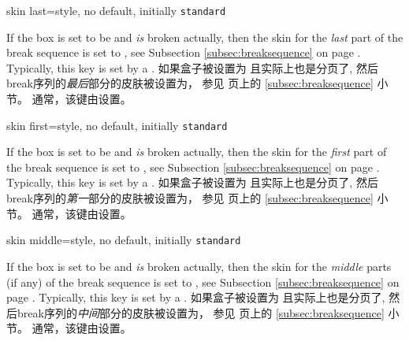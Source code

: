 \begin{docTcbKey}{skin last}{=}{style, no default, initially \texttt{standard}}
\begin{stripedbox}
If the box is set to be  and \emph{is} broken actually,
then the skin for the \emph{last} part of the break sequence
is set to , see Subsection \ref{subsec:breaksequence} on page \pageref{subsec:breaksequence}.
Typically, this key is set by a .
\tcblower
如果盒子被设置为 且实际上也是分页了,%
然后break序列的\emph{最后}部分的皮肤被设置为，
参见 \pageref{subsec:breaksequence} 页上的 \ref{subsec:breaksequence} 小节。
通常，该键由设置。
\end{stripedbox}
\end{docTcbKey}

\begin{docTcbKey}{skin first}{=}{style, no default, initially \texttt{standard}}
\begin{stripedbox}
If the box is set to be  and \emph{is} broken actually,
then the skin for the \emph{first} part of the break sequence
is set to , see Subsection \ref{subsec:breaksequence} on page \pageref{subsec:breaksequence}.
Typically, this key is set by a .
\tcblower
如果盒子被设置为 且实际上也是分页了,%
然后break序列的\emph{第一}部分的皮肤被设置为，
参见 \pageref{subsec:breaksequence} 页上的 \ref{subsec:breaksequence} 小节。
通常，该键由设置。
\end{stripedbox}
\end{docTcbKey}


\begin{docTcbKey}{skin middle}{=}{style, no default, initially \texttt{standard}}
\begin{stripedbox}
If the box is set to be  and \emph{is} broken actually,
then the skin for the \emph{middle} parts (if any) of the break sequence
is set to , see Subsection \ref{subsec:breaksequence} on page \pageref{subsec:breaksequence}.
Typically, this key is set by a .
\tcblower
如果盒子被设置为 且实际上也是分页了,%
然后break序列的\emph{中间}部分的皮肤被设置为，
参见 \pageref{subsec:breaksequence} 页上的 \ref{subsec:breaksequence} 小节。
通常，该键由设置。
\end{stripedbox}
\end{docTcbKey}


